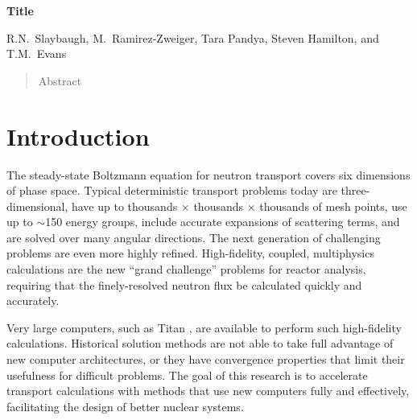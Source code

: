 \documentclass[preprint,12pt]{elsarticle}
\begin{document}
\setcounter{page}{2}
  

\begin{center}

  {\large \bf Title}
  
  \vspace{0.3in}
  
  R.N.\ Slaybaugh, M.\ Ramirez-Zweiger, Tara Pandya, Steven Hamilton, and T.M.\ Evans
  
\end{center}

\doublespacing

\vspace{0.3in}

\begin{abstract}

  Abstract

\end{abstract}

\newpage


\section{Introduction}
\label{sec:intro}
The steady-state Boltzmann equation for neutron transport covers six dimensions of phase space. Typical deterministic transport problems today are three-dimensional, have up to thousands $\times$ thousands $\times$ thousands of mesh points, use up to $\sim$150 energy groups, include accurate expansions of scattering terms, and are solved over many angular directions. The next generation of challenging problems are even more highly refined. High-fidelity, coupled, multiphysics calculations are the new ``grand challenge'' problems for reactor analysis, requiring that the finely-resolved neutron flux be calculated quickly and accurately.

Very large computers, such as Titan \cite{Titan2013}, are available to perform such high-fidelity calculations. Historical solution methods are not able to take full advantage of new computer architectures, or they have convergence properties that limit their usefulness for difficult problems. The goal of this research is to accelerate transport calculations with methods that use new computers fully and effectively, facilitating the design of better nuclear systems. 
\end{document}

